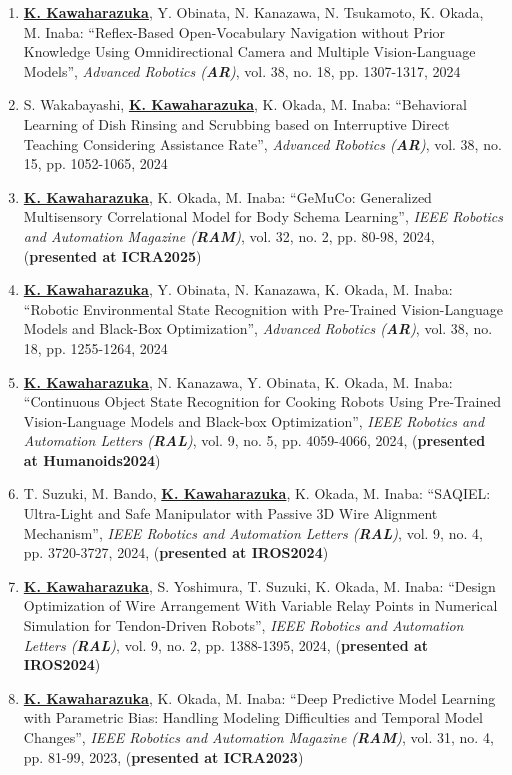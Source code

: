 \documentclass[letterpaper,11pt]{article}
\begin{document}
\begin{enumerate}
\item \underline{\textbf{K. Kawaharazuka}}, Y. Obinata, N. Kanazawa, N. Tsukamoto, K. Okada, M. Inaba: ``Reflex-Based Open-Vocabulary Navigation without Prior Knowledge Using Omnidirectional Camera and Multiple Vision-Language Models'', \textit{Advanced Robotics (\textit{\textbf{AR}})}, vol. 38, no. 18, pp. 1307-1317, 2024
\item S. Wakabayashi, \underline{\textbf{K. Kawaharazuka}}, K. Okada, M. Inaba: ``Behavioral Learning of Dish Rinsing and Scrubbing based on Interruptive Direct Teaching Considering Assistance Rate'', \textit{Advanced Robotics (\textit{\textbf{AR}})}, vol. 38, no. 15, pp. 1052-1065, 2024
\item \underline{\textbf{K. Kawaharazuka}}, K. Okada, M. Inaba: ``GeMuCo: Generalized Multisensory Correlational Model for Body Schema Learning'', \textit{IEEE Robotics and Automation Magazine (\textit{\textbf{RAM}})}, vol. 32, no. 2, pp. 80-98, 2024, (\textbf{presented at ICRA2025})
\item \underline{\textbf{K. Kawaharazuka}}, Y. Obinata, N. Kanazawa, K. Okada, M. Inaba: ``Robotic Environmental State Recognition with Pre-Trained Vision-Language Models and Black-Box Optimization'', \textit{Advanced Robotics (\textit{\textbf{AR}})}, vol. 38, no. 18, pp. 1255-1264, 2024
\item \underline{\textbf{K. Kawaharazuka}}, N. Kanazawa, Y. Obinata, K. Okada, M. Inaba: ``Continuous Object State Recognition for Cooking Robots Using Pre-Trained Vision-Language Models and Black-box Optimization'', \textit{IEEE Robotics and Automation Letters (\textit{\textbf{RAL}})}, vol. 9, no. 5, pp. 4059-4066, 2024, (\textbf{presented at Humanoids2024})
\item T. Suzuki, M. Bando, \underline{\textbf{K. Kawaharazuka}}, K. Okada, M. Inaba: ``SAQIEL: Ultra-Light and Safe Manipulator with Passive 3D Wire Alignment Mechanism'', \textit{IEEE Robotics and Automation Letters (\textit{\textbf{RAL}})}, vol. 9, no. 4, pp. 3720-3727, 2024, (\textbf{presented at IROS2024})
\item \underline{\textbf{K. Kawaharazuka}}, S. Yoshimura, T. Suzuki, K. Okada, M. Inaba: ``Design Optimization of Wire Arrangement With Variable Relay Points in Numerical Simulation for Tendon-Driven Robots'', \textit{IEEE Robotics and Automation Letters (\textit{\textbf{RAL}})}, vol. 9, no. 2, pp. 1388-1395, 2024, (\textbf{presented at IROS2024})
\item \underline{\textbf{K. Kawaharazuka}}, K. Okada, M. Inaba: ``Deep Predictive Model Learning with Parametric Bias: Handling Modeling Difficulties and Temporal Model Changes'', \textit{IEEE Robotics and Automation Magazine (\textit{\textbf{RAM}})}, vol. 31, no. 4, pp. 81-99, 2023, (\textbf{presented at ICRA2023})

\end{enumerate}
\end{document}
